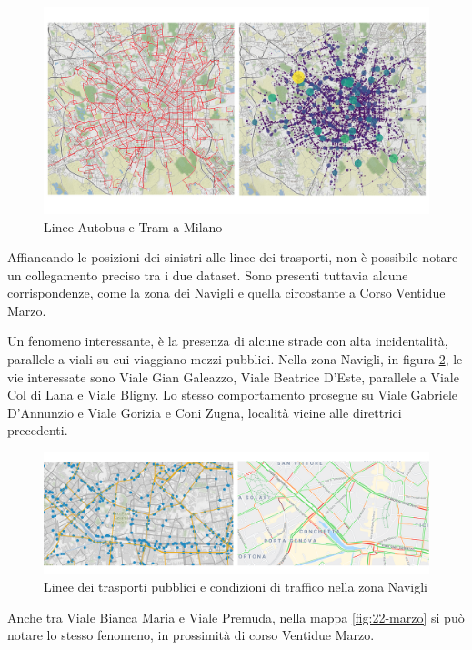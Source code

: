 \documentclass[a4paper,12pt]{report}
\begin{document}
\begin{figure}
    \includegraphics[width=\linewidth]{../src/atm/linee_atm.png}
    \caption{Linee Autobus e Tram a Milano}
    \label{fig:geo-trasporti}
\end{figure}

Affiancando le posizioni dei sinistri alle linee dei trasporti, 
non è possibile notare un collegamento preciso tra i due dataset. 
Sono presenti tuttavia alcune corrispondenze, come la zona dei Navigli 
e quella circostante a Corso Ventidue Marzo. 

Un fenomeno interessante, è la presenza di alcune strade con alta incidentalità, 
parallele a viali su cui viaggiano mezzi pubblici. 
Nella zona Navigli, in figura \ref{fig:navigli}, le vie 
interessate sono Viale Gian Galeazzo, Viale Beatrice D'Este, 
parallele a Viale Col di Lana e Viale Bligny.
Lo stesso comportamento prosegue su Viale Gabriele D'Annunzio e Viale Gorizia e Coni Zugna, 
località vicine alle direttrici precedenti.

\begin{figure}
    \includegraphics[width=\linewidth]{../src/atm/navigli.png}
    \caption{Linee dei trasporti pubblici e condizioni di traffico nella zona Navigli}
    \label{fig:navigli}
\end{figure}

Anche tra Viale Bianca Maria e Viale Premuda, nella mappa \ref{fig:22-marzo} si può 
notare lo stesso fenomeno, in prossimità di corso Ventidue Marzo.
\end{document}
